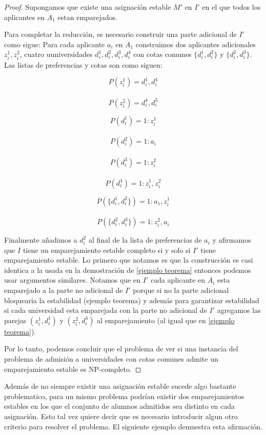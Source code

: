 \begin{proof}
Supongamos que existe una asignación estable $M'$ en $I'$ en el que todos los aplicantes en $A_1$ estan emparejados.


Para completar la reducción, es necesario construir una parte adicional de $I'$ como sigue: Para cada aplicante $a_i$ en $A_1$ construimos dos aplicantes adicionales $z_i^1,z_i^2$, cuatro uuniversidades $d_i^1,d_i^2,d_i^3,d_i^4$ con cotas comunes $\{d_i^1,d_i^2\}$ y $\{d_i^2,d_i^3\}$. Las listas de preferencias y cotas son como siguen:
\noindent \begin{minipage}{.3\linewidth}
$$P(z_i^1)=d_i^1,d_i^4$$ \\
$$P(z_i^2)=d_i^4,d_i^3$$ 
\end{minipage}%
\begin{minipage}{.3\linewidth}
$$P(d_i^1)=1:z_i^1$$ \\
$$P(d_i^2)=1:a_i$$ \\
$$P(d_i^3)=1: z_i^2$$ \\
$$P(d_i^4)=1:  z_i^1,z_i^2$$ 
\end{minipage}
\begin{minipage}{.4\linewidth}
$$P(\{d_i^1,d_i^2\})= 1:a_1,z_i^1$$ \\
$$P(\{d_i^2,d_i^3\})=1:z_i^2,a_i$$
\end{minipage}

Finalmente añadimos a $d_i^2$ al final de la lista de preferencias de $a_i$ y afirmamos que $I$ tiene un emparejamiento estable completo si y solo si $I'$ tiene emparejamiento estable.  Lo primero que notamos es que la construcción es casi identica a la usada en la demostración de \ref{ejemplo teorema} entonces podemos usar argumentos similares. Notamos que en $I'$ cada aplicante en $A_i$ esta emparejado a la parte no adicional de $I'$ porque si no la parte adicional bloquearia la estabilidad ({ejemplo teorema}) y además para garantizar estabilidad si cada universidad esta emparejada con la parte no adicional de $I'$ agregamos las parejas $(z_i^1,d_i^1)$ y  $(z_i^2,d_i^4)$ al emparejamiento (al igual que en \ref{ejemplo teorema}).

Por lo tanto, podemos concluir que el problema de ver si una instancia del problema de admisión a universidades con cotas comunes admite un emparejamiento estable es NP-completo.

\end{proof}

Además de no siempre existir una asignación estable sucede algo bastante problematico, para un mismo problema podrían existir dos emparejamientos estables en los que el conjunto de alumnos admitidos sea distinto en cada asignación. Esto tal vez quiere decir que es necesario introducir algun otro criterio para resolver el problema. El siguiente ejemplo demuestra esta afirmación. 


